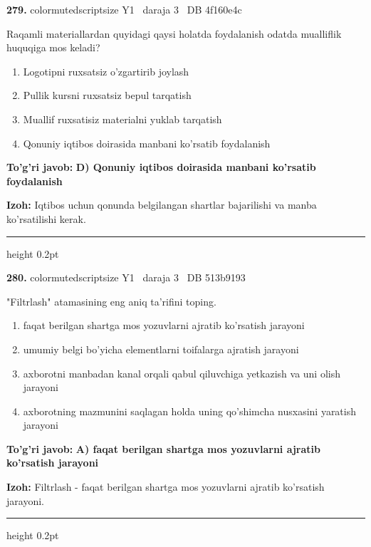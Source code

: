 \documentclass[10pt,a4paper,oneside]{article}
\begin{document}
\noindent\textbf{\color{ink}279.}  {color{muted}scriptsize Y1 \textbullet\ daraja 3 \textbullet\ DB 4f160e4c}
\par
Raqamli materiallardan quyidagi qaysi holatda foydalanish odatda mualliflik huquqiga mos keladi?
\begin{enumerate}[label=\Alph*),leftmargin=9mm]
\item Logotipni ruxsatsiz o'zgartirib joylash
\item Pullik kursni ruxsatsiz bepul tarqatish
\item Muallif ruxsatisiz materialni yuklab tarqatish
\item Qonuniy iqtibos doirasida manbani ko'rsatib foydalanish
\end{enumerate}
\begin{tcolorbox}[enhanced,breakable,colback=teal!4,colframe=teal!50!black,boxrule=0.5pt,arc=1.1mm,left=3mm,right=3mm,top=1.7mm,bottom=1.7mm,before skip=2mm,after skip=2mm]
\textbf{\color{teal}To'g'ri javob:} \textbf{D) Qonuniy iqtibos doirasida manbani ko'rsatib foydalanish}
\par\smallskip
\textbf{Izoh:} Iqtibos uchun qonunda belgilangan shartlar bajarilishi va manba ko'rsatilishi kerak.
\end{tcolorbox}
\vspace{2mm}\hrule height 0.2pt \vspace{3mm}

\noindent\textbf{\color{ink}280.}  {color{muted}scriptsize Y1 \textbullet\ daraja 3 \textbullet\ DB 513b9193}
\par
"Filtrlash" atamasining eng aniq ta'rifini toping.
\begin{enumerate}[label=\Alph*),leftmargin=9mm]
\item faqat berilgan shartga mos yozuvlarni ajratib ko'rsatish jarayoni
\item umumiy belgi bo'yicha elementlarni toifalarga ajratish jarayoni
\item axborotni manbadan kanal orqali qabul qiluvchiga yetkazish va uni olish jarayoni
\item axborotning mazmunini saqlagan holda uning qo'shimcha nusxasini yaratish jarayoni
\end{enumerate}
\begin{tcolorbox}[enhanced,breakable,colback=teal!4,colframe=teal!50!black,boxrule=0.5pt,arc=1.1mm,left=3mm,right=3mm,top=1.7mm,bottom=1.7mm,before skip=2mm,after skip=2mm]
\textbf{\color{teal}To'g'ri javob:} \textbf{A) faqat berilgan shartga mos yozuvlarni ajratib ko'rsatish jarayoni}
\par\smallskip
\textbf{Izoh:} Filtrlash - faqat berilgan shartga mos yozuvlarni ajratib ko'rsatish jarayoni.
\end{tcolorbox}
\vspace{2mm}\hrule height 0.2pt \vspace{3mm}
\end{document}
